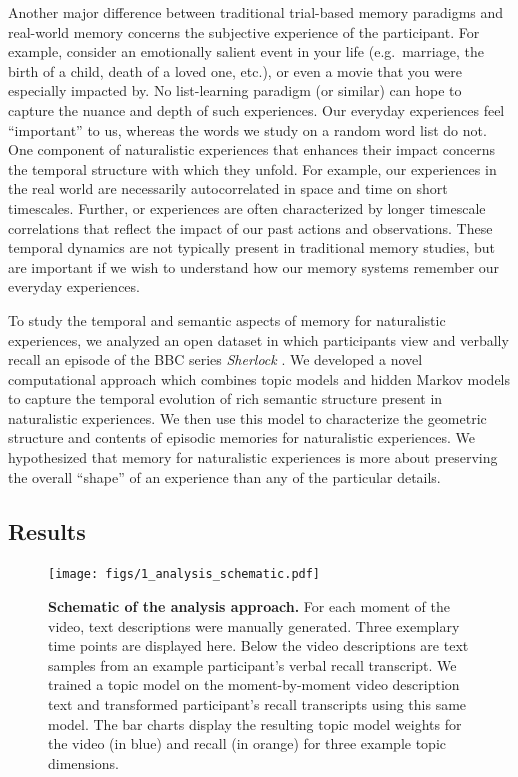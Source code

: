 \documentclass{article}
\begin{document}
{%

Another major difference between traditional trial-based memory paradigms and real-world memory concerns the subjective experience of the participant.  For example, consider an emotionally salient event in your life (e.g.\ marriage, the birth of a child, death of a loved one, etc.), or even a movie that you were especially impacted by.  No list-learning paradigm (or similar) can hope to capture the nuance and depth of such experiences.  Our everyday experiences feel ``important'' to us, whereas the words we study on a random word list do not.  One component of naturalistic experiences that enhances their impact concerns the temporal structure with which they unfold.  For example, our experiences in the real world are necessarily autocorrelated in space and time on short timescales.  Further, or experiences are often characterized by longer timescale correlations that reflect the impact of our past actions and observations.  These temporal dynamics are not typically present in traditional memory studies, but are important if we wish to understand how our memory systems remember our everyday experiences.

To study the temporal and semantic aspects of memory for naturalistic experiences, we analyzed an open dataset in which participants view and verbally recall an episode of the BBC series \textit{Sherlock}  \citep{ChenEtal17}. We developed a novel computational approach which combines topic models \citep{BleiEtal03} and hidden Markov models \citep{Rabi89, BaldEtal17} to capture the temporal evolution of rich semantic structure present in naturalistic experiences. We then use this model to characterize the geometric structure and contents of episodic memories for naturalistic experiences. We hypothesized that memory for naturalistic experiences is more about preserving the overall ``shape'' of an experience than any of the particular details.

\subsection{Results}

\begin{figure}[t!]
\centering
\texttt{[image: figs/1\_analysis\_schematic.pdf]}
\caption{\small \textbf{Schematic of the analysis approach.} For each moment of the video, text descriptions were manually generated. Three exemplary time points are displayed here.  Below the video descriptions are text samples from an example participant's verbal recall transcript.  We trained a topic model on the moment-by-moment video description text and transformed participant's recall transcripts using this same model. The bar charts display the resulting topic model weights for the video (in blue) and recall (in orange) for three example topic dimensions.}
\label{fig:schematic}
\end{figure}

}
\end{document}
